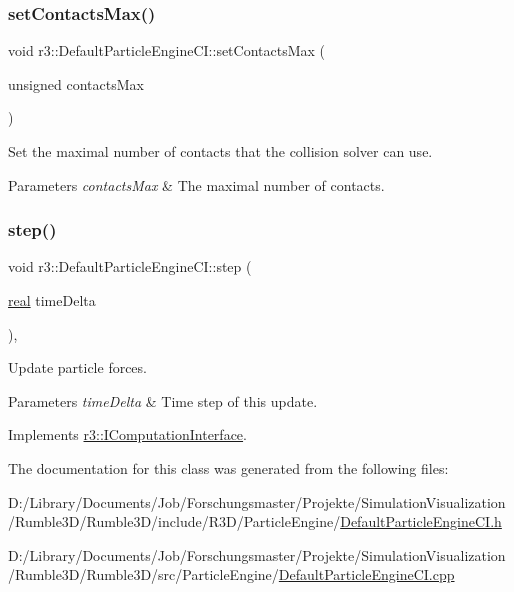 \subsubsection{\texorpdfstring{set\+Contacts\+Max()}{setContactsMax()}}
{\footnotesize\ttfamily void r3\+::\+Default\+Particle\+Engine\+C\+I\+::set\+Contacts\+Max (\begin{DoxyParamCaption}\item[{unsigned}]{contacts\+Max }\end{DoxyParamCaption})}



Set the maximal number of contacts that the collision solver can use. 


\begin{DoxyParams}{Parameters}
{\em contacts\+Max} & The maximal number of contacts. \\
\hline
\end{DoxyParams}
\mbox{\label{classr3_1_1_default_particle_engine_c_i_a7c58fd00ec521410e1b412e9885ee0d2}} 
\subsubsection{\texorpdfstring{step()}{step()}}
{\footnotesize\ttfamily void r3\+::\+Default\+Particle\+Engine\+C\+I\+::step (\begin{DoxyParamCaption}\item[{\mbox{\hyperlink{namespacer3_ab2016b3e3f743fb735afce242f0dc1eb}{real}}}]{time\+Delta }\end{DoxyParamCaption})\hspace{0.3cm}{\ttfamily [override]}, {\ttfamily [virtual]}}



Update particle forces. 


\begin{DoxyParams}{Parameters}
{\em time\+Delta} & Time step of this update. \\
\hline
\end{DoxyParams}


Implements \mbox{\hyperlink{classr3_1_1_i_computation_interface_aaa12bcc35005f32a1984b38de97696cb}{r3\+::\+I\+Computation\+Interface}}.



The documentation for this class was generated from the following files\+:\begin{DoxyCompactItemize}
\item 
D\+:/\+Library/\+Documents/\+Job/\+Forschungsmaster/\+Projekte/\+Simulation\+Visualization/\+Rumble3\+D/\+Rumble3\+D/include/\+R3\+D/\+Particle\+Engine/\mbox{\hyperlink{_default_particle_engine_c_i_8h}{Default\+Particle\+Engine\+C\+I.\+h}}\item 
D\+:/\+Library/\+Documents/\+Job/\+Forschungsmaster/\+Projekte/\+Simulation\+Visualization/\+Rumble3\+D/\+Rumble3\+D/src/\+Particle\+Engine/\mbox{\hyperlink{_default_particle_engine_c_i_8cpp}{Default\+Particle\+Engine\+C\+I.\+cpp}}\end{DoxyCompactItemize}
